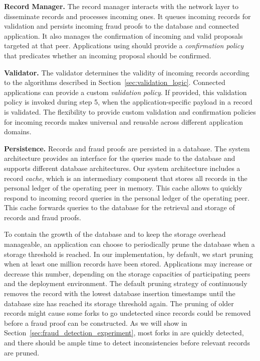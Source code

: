\textbf{Record Manager.}
The record manager interacts with the network layer to disseminate records and processes incoming ones.
It queues incoming records for validation and persists incoming fraud proofs to the database and connected application.
It also manages the confirmation of incoming and valid proposals targeted at that peer.
Applications using \TrustChain{} should provide a \emph{confirmation policy} that predicates whether an incoming proposal should be confirmed.

\textbf{Validator.}
The validator determines the validity of incoming records according to the algorithms described in Section~\ref{sec:validation_logic}.
Connected applications can provide a custom \emph{validation policy}.
If provided, this validation policy is invoked during step 5, when the application-specific payload in a record is validated.
The flexibility to provide custom validation and confirmation policies for incoming records makes \TrustChain{} universal and reusable across different application domains.

\textbf{Persistence.}
Records and fraud proofs are persisted in a database.
The \TrustChain{} system architecture provides an interface for the queries made to the database and supports different database architectures.
Our system architecture includes a record \emph{cache}, which is an intermediary component that stores all records in the personal ledger of the operating peer in memory.
This cache allows \TrustChain{} to quickly respond to incoming record queries in the personal ledger of the operating peer.
This cache forwards queries to the database for the retrieval and storage of records and fraud proofs.

To contain the growth of the database and to keep the storage overhead manageable, an application can choose to periodically prune the \TrustChain{} database when a storage threshold is reached.
In our implementation, by default, we start pruning when at least one million records have been stored.
Applications may increase or decrease this number, depending on the storage capacities of participating peers and the deployment environment.
The default pruning strategy of \TrustChain{} continuously removes the record with the lowest database insertion timestamps until the database size has reached its storage threshold again.
The pruning of older records might cause some forks to go undetected since records could be removed before a fraud proof can be constructed.
As we will show in Section~\ref{sec:fraud_detection_experiment}, most forks in \TrustChain{} are quickly detected, and there should be ample time to detect inconsistencies before relevant records are pruned.

